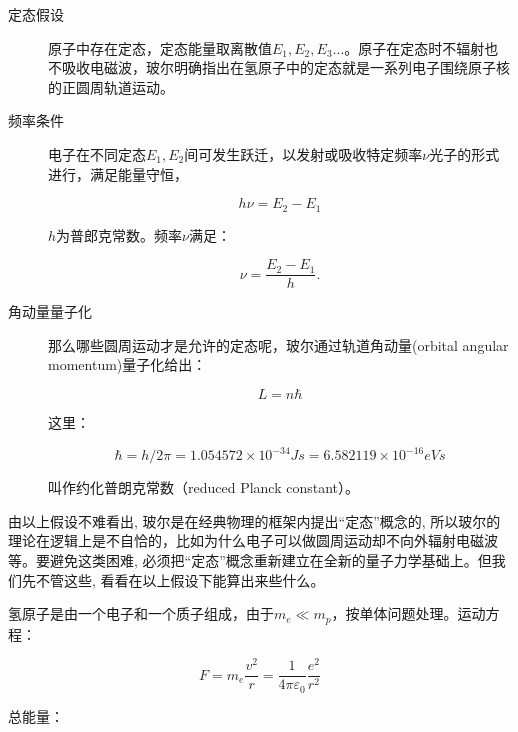 

\begin{description}
    \item[定态假设] 原子中存在定态，定态能量取离散值$E_1 ,E_2 ,E_3 ...$。原子在定态时不辐射也不吸收电磁波，玻尔明确指出在氢原子中的定态就是一系列电子围绕原子核的正圆周轨道运动。
    \item[频率条件] 电子在不同定态$E_1 ,E_2 $间可发生跃迁，以发射或吸收特定频率$\nu$光子的形式进行，满足能量守恒，

\begin{equation}
h \nu = E_2 - E_1
\end{equation}

$h$为普郎克常数。频率$\nu$满足：
    
\begin{equation}
\nu  = \frac{{E_2  - E_1 }}{h}.
\end{equation}
    
    \item[角动量量子化] 那么哪些圆周运动才是允许的定态呢，玻尔通过轨道角动量(orbital angular momentum)量子化给出：
    
\begin{equation}
L = n\hbar
\end{equation}

这里：

\begin{equation}
\hbar  = h/2\pi = 1.054572 \times 10^{-34} Js = 6.582119 \times 10^{-16} eV s  
\end{equation}

叫作约化普朗克常数（reduced Planck constant）。

\end{description}

由以上假设不难看出, 玻尔是在经典物理的框架内提出``定态''概念的,
所以玻尔的理论在逻辑上是不自恰的，比如为什么电子可以做圆周运动却不向外辐射电磁波等。要避免这类困难,
必须把``定态''概念重新建立在全新的量子力学基础上。但我们先不管这些,
看看在以上假设下能算出来些什么。

氢原子是由一个电子和一个质子组成，由于$m_e  \ll m_p
$，按单体问题处理。运动方程：

\begin{equation}
F = m_e \frac{{v^2 }}{r} = \frac{1}{{4\pi \varepsilon _0 }}\frac{{e^2 }}{{r^2 }}
\end{equation}

总能量：

